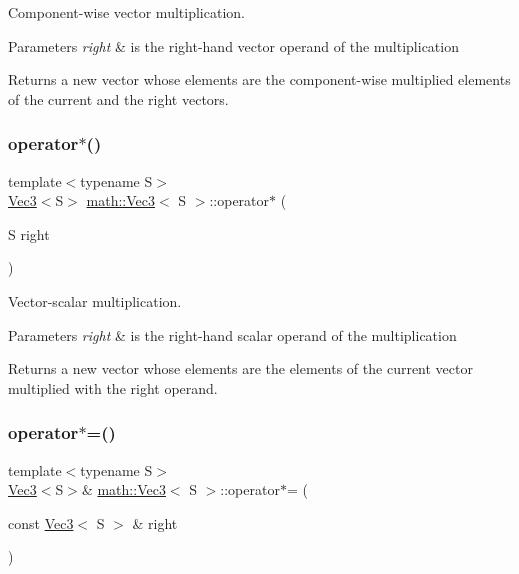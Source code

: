 Component-\/wise vector multiplication.


\begin{DoxyParams}{Parameters}
{\em right} & is the right-\/hand vector operand of the multiplication\\
\hline
\end{DoxyParams}
\begin{DoxyReturn}{Returns}
a new vector whose elements are the component-\/wise multiplied elements of the current and the right vectors. 
\end{DoxyReturn}
\mbox{\label{classmath_1_1_vec3_a0b6b8e5f817bb76537452b0df7fbdd06}} 
\subsubsection{\texorpdfstring{operator$\ast$()}{operator*()}\hspace{0.1cm}{\footnotesize\ttfamily [2/2]}}
{\footnotesize\ttfamily template$<$typename S$>$ \\
\hyperlink{classmath_1_1_vec3}{Vec3}$<$S$>$ \hyperlink{classmath_1_1_vec3}{math\+::\+Vec3}$<$ S $>$\+::operator$\ast$ (\begin{DoxyParamCaption}\item[{S}]{right }\end{DoxyParamCaption})\hspace{0.3cm}{\ttfamily [inline]}}

Vector-\/scalar multiplication.


\begin{DoxyParams}{Parameters}
{\em right} & is the right-\/hand scalar operand of the multiplication\\
\hline
\end{DoxyParams}
\begin{DoxyReturn}{Returns}
a new vector whose elements are the elements of the current vector multiplied with the right operand. 
\end{DoxyReturn}
\mbox{\label{classmath_1_1_vec3_a849a0602d155721bd4ab79edc83c5e57}} 
\subsubsection{\texorpdfstring{operator$\ast$=()}{operator*=()}\hspace{0.1cm}{\footnotesize\ttfamily [1/2]}}
{\footnotesize\ttfamily template$<$typename S$>$ \\
\hyperlink{classmath_1_1_vec3}{Vec3}$<$S$>$\& \hyperlink{classmath_1_1_vec3}{math\+::\+Vec3}$<$ S $>$\+::operator$\ast$= (\begin{DoxyParamCaption}\item[{const \hyperlink{classmath_1_1_vec3}{Vec3}$<$ S $>$ \&}]{right }\end{DoxyParamCaption})\hspace{0.3cm}{\ttfamily [inline]}}

